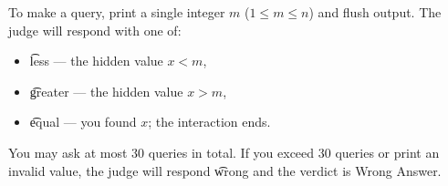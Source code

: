 To make a query, print a single integer $m$ ($1 \leq m \leq n$) and flush output.
The judge will respond with one of:

\begin{itemize}
    \item \t{less} --- the hidden value $x < m$,
    \item \t{greater} --- the hidden value $x > m$,
    \item \t{equal} --- you found $x$; the interaction ends.
\end{itemize}

You may ask at most $30$ queries in total.
If you exceed $30$ queries or print an invalid value, the judge will respond \t{wrong} and the verdict is Wrong Answer.
